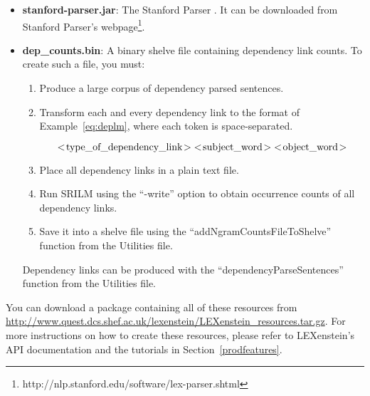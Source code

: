 \begin{itemize}
	\item \textbf{stanford-parser.jar}: The Stanford Parser \cite{stanfordparser}. It can be downloaded from Stanford Parser's webpage\footnote{http://nlp.stanford.edu/software/lex-parser.shtml}.
	
	\item \textbf{dep\_counts.bin}: A binary shelve file containing dependency link counts. To create such a file, you must:
	
		\begin{enumerate}
			\item Produce a large corpus of dependency parsed sentences.
			\item Transform each and every dependency link to the format of Example~\ref{eq:deplm}, where each token is space-separated.
			
				\begin{equation}
				\label{eq:deplm}
				<\!\textup{type\_of\_dependency\_link}\!>\; <\!\textup{subject\_word}\!>\; <\!\textup{object\_word}\!>
				\end{equation}
				
			\item Place all dependency links in a plain text file.
			\item Run SRILM using the ``-write'' option to obtain occurrence counts of all dependency links.
			\item Save it into a shelve file using the ``addNgramCountsFileToShelve'' function from the Utilities file.
		\end{enumerate}
		
		Dependency links can be produced with the ``dependencyParseSentences'' function from the Utilities file.

\end{itemize}

You can download a package containing all of these resources from \url{http://www.quest.dcs.shef.ac.uk/lexenstein/LEXenstein_resources.tar.gz}. For more instructions on how to create these resources, please refer to LEXenstein's API documentation and the tutorials in Section~\ref{prodfeatures}.
